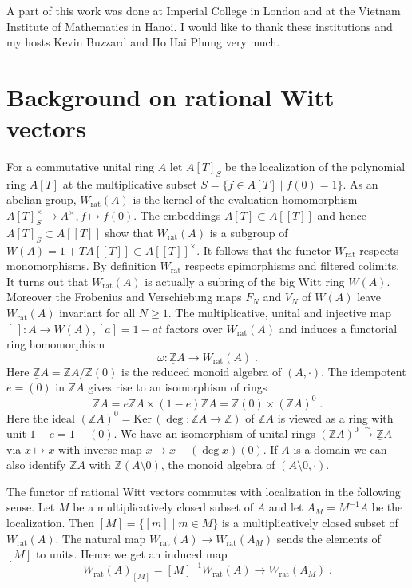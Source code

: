 \documentclass[12pt,leqno]{article}
\newcommand{\Z}{{\mathbb{Z}}}
\newcommand{\uZ}{\underline{\Z}}
\newcommand{\Ker}{\mathrm{Ker}\,}
\newcommand{\rat}{\mathrm{rat}}
\newcommand{\ox}{\overline{x}}
\newcommand{\silo}{\stackrel{\sim}{\rightarrow}}
\begin{document}
A part of this work was done at Imperial College in London and at the Vietnam Institute of Mathematics in Hanoi. I would like to thank these institutions and my hosts Kevin Buzzard and Ho Hai Phung very much.
%
\section{Background on rational Witt vectors} \label{sec:1}

For a commutative unital ring $A$ let $A [T]_S$ be the localization of the polynomial ring $A [T]$ at the multiplicative subset $S = \{ f \in A [T] \mid f (0) = 1 \}$. As an abelian group, $W_{\rat} (A)$ is the kernel of the evaluation homomorphism $A [T]^{\times}_S \to A^{\times} , f \mapsto f (0)$. The embeddings $A [T] \subset A [[T]]$ and hence $A [T]_S \subset A [[T]]$ show that $W_{\rat} (A)$ is a subgroup of $W (A) = 1 + T A [[T]] \subset A [[T]]^{\times}$. It follows that the functor $W_{\rat}$ respects monomorphisms. By definition $W_{\rat}$ respects epimorphisms and filtered colimits. It turns out that $W_{\rat} (A)$ is actually a subring of the big Witt ring $W (A)$. Moreover the Frobenius and Verschiebung maps $F_N$ and $V_N$ of $W (A)$ leave $W_{\rat} (A)$ invariant for all $N \ge 1$. The multiplicative, unital and injective map $[\,] : A \to W (A) , [a] = 1-at$ factors over $W_{\rat} (A)$ and induces a functorial ring homomorphism
\begin{equation}
\label{eq:1}
\omega : \uZ A \longrightarrow W_{\rat} (A) \; .
\end{equation}
Here $\uZ A = \Z A / \Z (0)$ is the reduced monoid algebra of $(A , \cdot)$. The idempotent $e = (0)$ in $\Z A$ gives rise to an isomorphism of rings 
\[
\Z A = e \Z A \times (1-e) \Z A = \Z (0) \times (\Z A)^0 \; .
\]
Here the ideal $(\Z A)^0 = \Ker (\deg : \Z A \to \Z)$ of $\Z A$ is viewed as a ring with unit $1 -e = 1 - (0)$. We have an isomorphism of unital rings $(\Z A)^0 \silo \uZ A$ via $x \mapsto \ox$ with inverse map $\ox \mapsto x - (\deg x) (0)$. If $A$ is a domain we can also identify $\uZ A$ with $\Z (A \setminus 0)$, the monoid algebra of $(A \setminus 0 , \cdot)$. 

The functor of rational Witt vectors commutes with localization in the following sense. Let $M$ be a multiplicatively closed subset of $A$ and let $A_M = M^{-1} A$ be the localization. Then $[M] = \{ [m] \mid m \in M \}$ is a multiplicatively closed subset of $W_{\rat} (A)$. The natural map $W_{\rat} (A) \to W_{\rat} (A_M)$ sends the elements of $[M]$ to units. Hence we get an induced map
\[
W_{\rat} (A)_{[M]} = [M]^{-1} W_{\rat} (A) \longrightarrow W_{\rat} (A_M) \; .
\]
\end{document}
